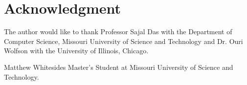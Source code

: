 \documentclass[journal,onecolumn]{IEEEtran}
\begin{document}



\section*{Acknowledgment}
The author would like to thank Professor Sajal Das with the Department of Computer Science, Missouri University of Science and Technology and Dr. Ouri Wolfson with the University of Illinois, Chicago.

\ifCLASSOPTIONcaptionsoff
  \newpage
\fi




\begin{IEEEbiographynophoto}{Matthew Whitesides}
  Master's Student at Missouri University of Science and Technology.
\end{IEEEbiographynophoto}

\end{document}
